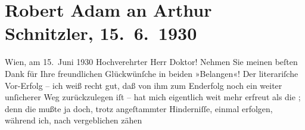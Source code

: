 

         
         \renewcommand{\erwaehntePersonen}{Personen: Robert Adam}
         \renewcommand{\erwaehnteInstitutionen}{Institutionen: Drei Masken-Verlag, Handelsgericht Wien}
         \renewcommand{\erwaehnteOrte}{Orte: Berlin, Wien}
         \renewcommand{\erwaehnteWerke}{Werke: Margot und das Jugendgericht}
               \section[Robert Adam an Arthur Schnitzler, 15. 6. 1930]{ Robert Adam an Arthur Schnitzler, 15. 6. 1930}\nopagebreak{}\rehead{ }\begin{ledgroupsized}[t]{13cm}\normalsize\beginnumbering \toendnotes[C]{\smallbreak\pagebreak[2]} 
\toendnotes[C]{\smallbreak}\pstart
           \raggedleft{}{\pb}Wien, am 15. Juni 1930\pend
           \pstart{}Hochverehrter Herr Doktor!\pend\pstart
           Nehmen Sie meinen beſten Dank für Ihre freundlichen Glückwünſche in beiden
               »Belangen«!\pend
           \pstart
           Der literariſche Vor-Erfolg – ich weiß recht gut, daß von ihm zum Enderfolg noch ein
               weiter unſicherer Weg zurückzulegen iſt – hat mich eigentlich weit mehr erfreut als
               die \label{K_L02538-1v}\label{K_L02538-1h}; denn die mußte ja doch, trotz
               angeſtammter Hinderniſſe, einmal erfolgen, während ich, nach vergeblichen zähen

\end{ledgroupsized}
